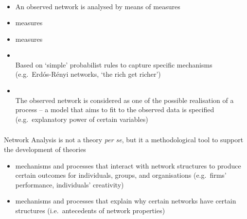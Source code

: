 \documentclass[8pt]{beamer}
\begin{document}
\begin{frame}
\frametitle{\insertsection}


{\color{blue}{Descriptive network analysis}}\\ 
    \begin{itemize}
    \item An observed network is analysed by means of measures
    \item {\color{blue}{Network-level}} measures
    \item {\color{blue}{Node-level}} measures
    \end{itemize}

\bigskip
	
{\color{blue}{Modelling and inference of networks}}
    \begin{itemize}
    \item {\color{blue}{Mathematical models}}\\
    Based on `simple' probabilist rules to capture specific mechanisms (e.g.\ Erd\'os-R\'enyi networks, `the rich get richer')		
    \item {\color{blue}{Statistical models}}\\ 
    The observed network is considered as one of the possible realisation of a process -- a model that aims to fit to the observed data is specified (e.g.\ explanatory power of certain variables)
    \end{itemize}


\end{frame}


\begin{frame}
\frametitle{\insertsection}

Network Analysis is not a theory \textit{per se}, but it a methodological tool to support the development of theories \cite{Borgatti2011}

\begin{itemize}
    \item {\color{blue}{Network theory:}} mechanisms and processes that interact with network structures to produce certain outcomes for individuals, groups, and organisations (e.g.\ firms' performance, individuals' creativity)	
    
    \medskip
    
    \item {\color{blue}{Theory of networks:}} mechanisms and processes that explain why certain networks have certain structures (i.e.\ antecedents of network properties)
\end{itemize}

\end{frame}
\end{document}
